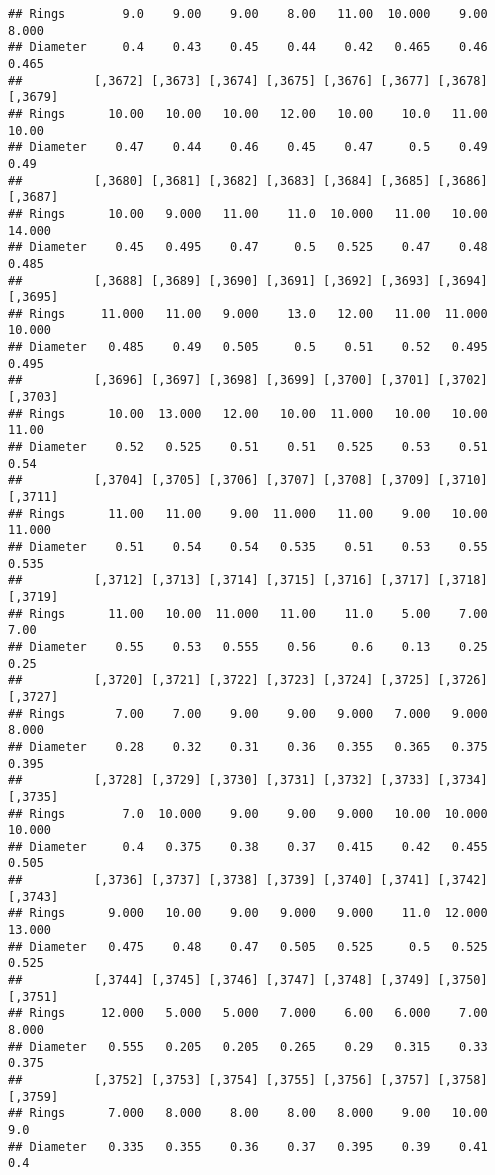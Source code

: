 \documentclass[
]{article}
\begin{document}
\begin{verbatim}
## Rings        9.0    9.00    9.00    8.00   11.00  10.000    9.00   8.000
## Diameter     0.4    0.43    0.45    0.44    0.42   0.465    0.46   0.465
##          [,3672] [,3673] [,3674] [,3675] [,3676] [,3677] [,3678] [,3679]
## Rings      10.00   10.00   10.00   12.00   10.00    10.0   11.00   10.00
## Diameter    0.47    0.44    0.46    0.45    0.47     0.5    0.49    0.49
##          [,3680] [,3681] [,3682] [,3683] [,3684] [,3685] [,3686] [,3687]
## Rings      10.00   9.000   11.00    11.0  10.000   11.00   10.00  14.000
## Diameter    0.45   0.495    0.47     0.5   0.525    0.47    0.48   0.485
##          [,3688] [,3689] [,3690] [,3691] [,3692] [,3693] [,3694] [,3695]
## Rings     11.000   11.00   9.000    13.0   12.00   11.00  11.000  10.000
## Diameter   0.485    0.49   0.505     0.5    0.51    0.52   0.495   0.495
##          [,3696] [,3697] [,3698] [,3699] [,3700] [,3701] [,3702] [,3703]
## Rings      10.00  13.000   12.00   10.00  11.000   10.00   10.00   11.00
## Diameter    0.52   0.525    0.51    0.51   0.525    0.53    0.51    0.54
##          [,3704] [,3705] [,3706] [,3707] [,3708] [,3709] [,3710] [,3711]
## Rings      11.00   11.00    9.00  11.000   11.00    9.00   10.00  11.000
## Diameter    0.51    0.54    0.54   0.535    0.51    0.53    0.55   0.535
##          [,3712] [,3713] [,3714] [,3715] [,3716] [,3717] [,3718] [,3719]
## Rings      11.00   10.00  11.000   11.00    11.0    5.00    7.00    7.00
## Diameter    0.55    0.53   0.555    0.56     0.6    0.13    0.25    0.25
##          [,3720] [,3721] [,3722] [,3723] [,3724] [,3725] [,3726] [,3727]
## Rings       7.00    7.00    9.00    9.00   9.000   7.000   9.000   8.000
## Diameter    0.28    0.32    0.31    0.36   0.355   0.365   0.375   0.395
##          [,3728] [,3729] [,3730] [,3731] [,3732] [,3733] [,3734] [,3735]
## Rings        7.0  10.000    9.00    9.00   9.000   10.00  10.000  10.000
## Diameter     0.4   0.375    0.38    0.37   0.415    0.42   0.455   0.505
##          [,3736] [,3737] [,3738] [,3739] [,3740] [,3741] [,3742] [,3743]
## Rings      9.000   10.00    9.00   9.000   9.000    11.0  12.000  13.000
## Diameter   0.475    0.48    0.47   0.505   0.525     0.5   0.525   0.525
##          [,3744] [,3745] [,3746] [,3747] [,3748] [,3749] [,3750] [,3751]
## Rings     12.000   5.000   5.000   7.000    6.00   6.000    7.00   8.000
## Diameter   0.555   0.205   0.205   0.265    0.29   0.315    0.33   0.375
##          [,3752] [,3753] [,3754] [,3755] [,3756] [,3757] [,3758] [,3759]
## Rings      7.000   8.000    8.00    8.00   8.000    9.00   10.00     9.0
## Diameter   0.335   0.355    0.36    0.37   0.395    0.39    0.41     0.4

\end{verbatim}
\end{document}
